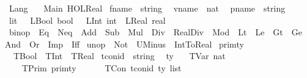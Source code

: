 %
\begin{isabellebody}%
%
%
\isadelimdocument
%
\endisadelimdocument
%
\isatagdocument
%
\isamarkuptrue%
%
\endisatagdocument
{\isafolddocument}%
%
\isadelimdocument
%
\endisadelimdocument
%
\isadelimtheory
%
\endisadelimtheory
%
\isatagtheory
{}\isamarkupfalse%
\ Lang\isanewline
\ \ \ Main\ HOL{\isachardot}{\kern0pt}Real\isanewline
{}%
\endisatagtheory
{\isafoldtheory}%
%
\isadelimtheory
\isanewline
%
\endisadelimtheory
\isanewline
{}\isamarkupfalse%
\ fname\ {\isacharequal}{\kern0pt}\ string\ \isanewline
{}\isamarkupfalse%
\ vname\ {\isacharequal}{\kern0pt}\ nat\ \isanewline
{}\isamarkupfalse%
\ pname\ {\isacharequal}{\kern0pt}\ string\ \isanewline
\isanewline
{}\isamarkupfalse%
\ lit\ {\isacharequal}{\kern0pt}\ \ LBool\ bool\ \ {\isacharbar}{\kern0pt}\ LInt\ int\ {\isacharbar}{\kern0pt}\ LReal\ real\isanewline
\isanewline
{}\isamarkupfalse%
\ binop\ {\isacharequal}{\kern0pt}\ Eq\ {\isacharbar}{\kern0pt}\ Neq\ {\isacharbar}{\kern0pt}\ Add\ {\isacharbar}{\kern0pt}\ Sub\ {\isacharbar}{\kern0pt}\ Mul\ {\isacharbar}{\kern0pt}\ Div\ {\isacharbar}{\kern0pt}\ RealDiv\ {\isacharbar}{\kern0pt}\ Mod\ {\isacharbar}{\kern0pt}\ Lt\ {\isacharbar}{\kern0pt}\ Le\ {\isacharbar}{\kern0pt}\ Gt\ {\isacharbar}{\kern0pt}\ Ge\ {\isacharbar}{\kern0pt}\ And\ {\isacharbar}{\kern0pt}\ Or\ {\isacharbar}{\kern0pt}\ Imp\ {\isacharbar}{\kern0pt}\ Iff\isanewline
{}\isamarkupfalse%
\ unop\ {\isacharequal}{\kern0pt}\ Not\ {\isacharbar}{\kern0pt}\ UMinus\ {\isacharbar}{\kern0pt}\ IntToReal\isanewline
\isanewline
{}\isamarkupfalse%
\ prim{\isacharunderscore}{\kern0pt}ty\ \isanewline
\ {\isacharequal}{\kern0pt}\ TBool\ {\isacharbar}{\kern0pt}\ TInt\ {\isacharbar}{\kern0pt}\ TReal\isanewline
\isanewline
{}\isamarkupfalse%
\ tcon{\isacharunderscore}{\kern0pt}id\ {\isacharequal}{\kern0pt}\ string\ \isanewline
\isanewline
{}\isamarkupfalse%
\ ty\isanewline
\ \ {\isacharequal}{\kern0pt}\ TVar\ nat\ {\isacharbar}{\kern0pt}\ \isanewline
\ \ \ \ TPrim\ prim{\isacharunderscore}{\kern0pt}ty\ {\isacharbar}{\kern0pt}\ \isanewline
\ \ \ \ TCon\ tcon{\isacharunderscore}{\kern0pt}id\ {\isachardoublequoteopen}ty\ list{\isachardoublequoteclose}\ \ {\isacharbar}{\kern0pt}\isanewline

\end{isabellebody}

